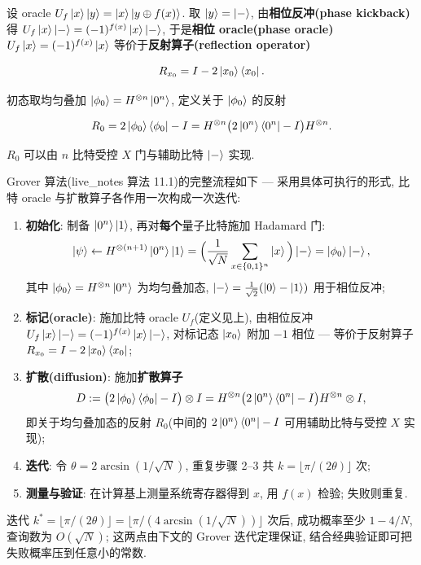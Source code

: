 \documentclass[utf8]{article} %
\numberwithin{equation}{section}   %
\newtheorem{Eg}{\hskip 2em {\color{black} 例}}[subsection]
\begin{document}
设 oracle $U_f\ket{x}\ket{y} = \ket{x}\ket{y \oplus f(x)}$. 取 $\ket{y} = \ket{-}$,
由\textbf{相位反冲(phase kickback)}得 $U_f\ket{x}\ket{-} = (-1)^{f(x)}\ket{x}\ket{-}$, 于是\textbf{相位 oracle(phase oracle)}
$U_f\ket{x} = (-1)^{f(x)}\ket{x}$ 等价于\textbf{反射算子(reflection operator)}

\begin{equation}
    R_{x_0} = I - 2\ket{x_0}\bra{x_0}.
\end{equation}

初态取均匀叠加 $\ket{\phi_0} = H^{\otimes n}\ket{0^n}$, 定义关于 $\ket{\phi_0}$ 的反射

\begin{equation}
    R_0 = 2\ket{\phi_0}\bra{\phi_0} - I = H^{\otimes n}\big(2\ket{0^n}\bra{0^n} - I\big)H^{\otimes n}.
\end{equation}

$R_0$ 可以由 $n$ 比特受控 $X$ 门与辅助比特 $\ket{-}$ 实现.

\begin{Eg}
    Grover 算法(live\_notes 算法 11.1)的完整流程如下 --- 采用具体可执行的形式, 
    比特 oracle 与扩散算子各作用一次构成一次迭代:
    \begin{enumerate}
        \item \textbf{初始化}: 制备 $\ket{0^n}\ket{1}$, 再对\textbf{每个}量子比特施加 Hadamard 门:
        \[ \ket{\psi} \leftarrow H^{\otimes(n+1)}\ket{0^n}\ket{1}
           = \Big(\frac{1}{\sqrt{N}}\sum_{x\in\{0,1\}^n}\ket{x}\Big)\ket{-}
           = \ket{\phi_0}\ket{-}, \]
        其中 $\ket{\phi_0} = H^{\otimes n}\ket{0^n}$ 为均匀叠加态, 
        $\ket{-} = \frac{1}{\sqrt{2}}(\ket{0}-\ket{1})$ 用于相位反冲;
        \item \textbf{标记(oracle)}: 施加比特 oracle $U_f$(定义见上), 由相位反冲
        $U_f\ket{x}\ket{-} = (-1)^{f(x)}\ket{x}\ket{-}$, 对标记态 $\ket{x_0}$ 附加 $-1$ 相位 ---
        等价于反射算子 $R_{x_0} = I - 2\ket{x_0}\bra{x_0}$;
        \item \textbf{扩散(diffusion)}: 施加\textbf{扩散算子}
        \[ D := \big(2\ket{\phi_0}\bra{\phi_0} - I\big)\otimes I
           = H^{\otimes n}\big(2\ket{0^n}\bra{0^n} - I\big)H^{\otimes n}\otimes I, \]
        即关于均匀叠加态的反射 $R_0$(中间的 $2\ket{0^n}\bra{0^n}-I$ 可用辅助比特与受控 $X$ 实现);
        \item \textbf{迭代}: 令 $\theta = 2\arcsin(1/\sqrt{N})$, 重复步骤 2--3 共
        $k = \lfloor \pi/(2\theta) \rfloor$ 次;
        \item \textbf{测量与验证}: 在计算基上测量系统寄存器得到 $x$, 用 $f(x)$ 检验;
        失败则重复.
    \end{enumerate}
    迭代 $k^* = \lfloor \pi/(2\theta) \rfloor = \lfloor \pi/(4\arcsin(1/\sqrt{N})) \rfloor$ 次后, 
    成功概率至少 $1 - 4/N$, 查询数为 $O(\sqrt{N})$; 这两点由下文的
    Grover 迭代定理保证, 结合经典验证即可把失败概率压到任意小的常数.
\end{Eg}
\end{document}
